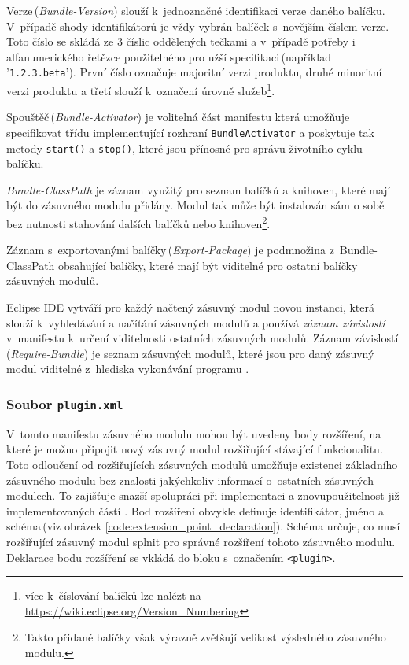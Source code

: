       Verze\,(\emph{Bundle-Version}) slouží k~jednoznačné identifikaci verze daného balíčku. V~případě shody identifikátorů je vždy vybrán balíček s~novějším číslem verze. Toto číslo se skládá ze 3 číslic oddělených tečkami a v~případě potřeby i alfanumerického řetězce použitelného pro užší specifikaci\,(například '\texttt{1.2.3.beta}'). První číslo označuje majoritní verzi produktu, druhé minoritní verzi produktu a třetí slouží k~označení úrovně služeb\footnote{více k~číslování balíčků lze nalézt na \url{https://wiki.eclipse.org/Version_Numbering}}.

      Spouštěč\,(\emph{Bundle-Activator}) je volitelná část manifestu která umožňuje specifikovat třídu implementující rozhraní \texttt{BundleActivator} a poskytuje tak metody \texttt{start()} a \texttt{stop()}, které jsou přínosné pro správu životního cyklu balíčku.

      \emph{Bundle-ClassPath} je záznam využitý pro seznam balíčků a knihoven, které mají být do zásuvného modulu přidány. Modul tak může být instalován sám o sobě bez nutnosti stahování dalších balíčků nebo knihoven\footnote{Takto přidané balíčky však výrazně zvětšují velikost výsledného zásuvného modulu.}.

      Záznam s~exportovanými balíčky\,(\emph{Export-Package}) je podmnožina z~Bundle-ClassPath obsahující balíčky, které mají být viditelné pro ostatní balíčky zásuvných modulů.

      Eclipse IDE vytváří pro každý načtený zásuvný modul novou instanci, která slouží k~vyhledávání a načítání zásuvných modulů a používá \emph{záznam závislostí} v~manifestu k~určení viditelnosti ostatních zásuvných modulů. Záznam závislostí\,(\emph{Require-Bundle}) je seznam zásuvných modulů, které jsou pro daný zásuvný modul viditelné z~hlediska vykonávání programu \cite{Plugins}.

      \subsubsection{Soubor \texttt{plugin.xml}}
      V~tomto manifestu zásuvného modulu mohou být uvedeny body rozšíření, na které je možno připojit nový zásuvný modul rozšiřující stávající funkcionalitu. Toto odloučení od rozšiřujících zásuvných modulů umožňuje existenci základního zásuvného modulu bez znalosti jakýchkoliv informací o~ostatních zásuvných modulech. To zajišťuje snazší spolupráci při implementaci a znovupoužitelnost již implementovaných částí \cite{Plugins}. Bod rozšíření obvykle definuje identifikátor, jméno a schéma\,(viz obrázek \ref{code:extension_point_declaration}). Schéma určuje, co musí rozšiřující zásuvný modul splnit pro správné rozšíření tohoto zásuvného modulu. Deklarace bodu rozšíření se vkládá do bloku s~označením \texttt{<plugin>}. 

